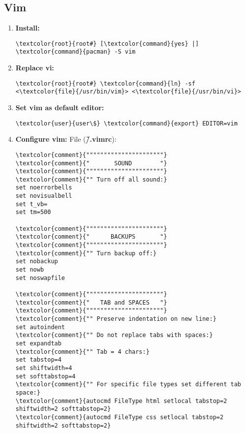 \documentclass[10pt, a4paper, onecolumn, openany]{book} %
\begin{document}
\subsection{Vim}
\begin{enumerate}
    \item \textbf{Install:}
\begin{Verbatim}[commandchars=\\\{\}]
\textcolor{root}{root#} [\textcolor{command}{yes} |] \textcolor{command}{pacman} -S vim
\end{Verbatim}
    \item \textbf{Replace vi:}
\begin{Verbatim}[commandchars=\\\{\}]
\textcolor{root}{root#} \textcolor{command}{ln} -sf <\textcolor{file}{/usr/bin/vim}> <\textcolor{file}{/usr/bin/vi}>
\end{Verbatim}
    \item \textbf{Set vim as default editor:}
\begin{Verbatim}[commandchars=\\\{\}]
\textcolor{user}{user\$} \textcolor{command}{export} EDITOR=vim
\end{Verbatim}
    \item \textbf{Configure vim:}
File (\textbf{\textcolor{file}{\~/.vimrc}}):
\begin{Verbatim}[commandchars=\\\{\}]
\textcolor{comment}{""""""""""""""""""""""}
\textcolor{comment}{"       SOUND        "}
\textcolor{comment}{""""""""""""""""""""""}
\textcolor{comment}{"" Turn off all sound:}
set noerrorbells
set novisualbell
set t_vb=
set tm=500

\textcolor{comment}{""""""""""""""""""""""}
\textcolor{comment}{"      BACKUPS       "}
\textcolor{comment}{""""""""""""""""""""""}
\textcolor{comment}{"" Turn backup off:}
set nobackup
set nowb
set noswapfile

\textcolor{comment}{""""""""""""""""""""""}
\textcolor{comment}{"   TAB and SPACES   "}
\textcolor{comment}{""""""""""""""""""""""}
\textcolor{comment}{"" Preserve indentation on new line:}
set autoindent
\textcolor{comment}{"" Do not replace tabs with spaces:}
set expandtab
\textcolor{comment}{"" Tab = 4 chars:}
set tabstop=4
set shiftwidth=4
set softtabstop=4
\textcolor{comment}{"" For specific file types set different tab space:}
\textcolor{comment}{autocmd FileType html setlocal tabstop=2 shiftwidth=2 softtabstop=2}
\textcolor{comment}{autocmd FileType css setlocal tabstop=2 shiftwidth=2 softtabstop=2}


\end{Verbatim}
\end{enumerate}
\end{document}

